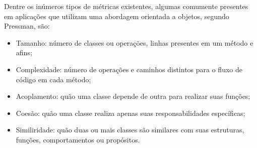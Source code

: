 Dentre os inúmeros tipos de métricas existentes, algumas comumente presentes em aplicações que utilizam uma abordagem orientada a objetos, segundo Pressman\cite{pressman_2009}, são:

\begin{itemize}
    \item Tamanho: número de classes ou operações, linhas presentes em um método e afins;
    \item Complexidade: número de operações e caminhos distintos para o fluxo de código em cada método;
    \item Acoplamento: quão uma classe depende de outra para realizar suas funções;
    \item Coesão: quão uma classe realiza apenas suas responsabilidades específicas;
    \item Similiridade: quão duas ou mais classes são similares com suas estruturas, funções, comportamentos ou propósitos.
\end{itemize}